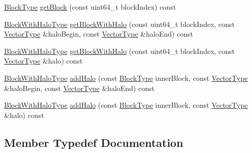 \begin{DoxyCompactItemize}
\item 
\hyperlink{classnifty_1_1tools_1_1Blocking_a597e0d4186d2d40ccb96698cc16775c6}{Block\+Type} \hyperlink{classnifty_1_1tools_1_1Blocking_ac73c329e83e247c73698ea88d52ad8a4}{get\+Block} (const uint64\+\_\+t block\+Index) const 
\item 
\hyperlink{classnifty_1_1tools_1_1Blocking_abebd9361d89cc399bc495861fa4e331d}{Block\+With\+Halo\+Type} \hyperlink{classnifty_1_1tools_1_1Blocking_a314e368a33595f0ffe72cfcdc12d102f}{get\+Block\+With\+Halo} (const uint64\+\_\+t block\+Index, const \hyperlink{classnifty_1_1tools_1_1Blocking_a5f8df3d4cdf09803217d729a04018fb3}{Vector\+Type} \&halo\+Begin, const \hyperlink{classnifty_1_1tools_1_1Blocking_a5f8df3d4cdf09803217d729a04018fb3}{Vector\+Type} \&halo\+End) const 
\item 
\hyperlink{classnifty_1_1tools_1_1Blocking_abebd9361d89cc399bc495861fa4e331d}{Block\+With\+Halo\+Type} \hyperlink{classnifty_1_1tools_1_1Blocking_aed0cce73bd05265b57bac992a3de37a0}{get\+Block\+With\+Halo} (const uint64\+\_\+t block\+Index, const \hyperlink{classnifty_1_1tools_1_1Blocking_a5f8df3d4cdf09803217d729a04018fb3}{Vector\+Type} \&halo) const 
\item 
\hyperlink{classnifty_1_1tools_1_1Blocking_abebd9361d89cc399bc495861fa4e331d}{Block\+With\+Halo\+Type} \hyperlink{classnifty_1_1tools_1_1Blocking_adfe3586bcaa6db42913304e929a120ac}{add\+Halo} (const \hyperlink{classnifty_1_1tools_1_1Blocking_a597e0d4186d2d40ccb96698cc16775c6}{Block\+Type} inner\+Block, const \hyperlink{classnifty_1_1tools_1_1Blocking_a5f8df3d4cdf09803217d729a04018fb3}{Vector\+Type} \&halo\+Begin, const \hyperlink{classnifty_1_1tools_1_1Blocking_a5f8df3d4cdf09803217d729a04018fb3}{Vector\+Type} \&halo\+End) const 
\item 
\hyperlink{classnifty_1_1tools_1_1Blocking_abebd9361d89cc399bc495861fa4e331d}{Block\+With\+Halo\+Type} \hyperlink{classnifty_1_1tools_1_1Blocking_a6baa908875fc3e55c698ffa96cc7b57c}{add\+Halo} (const \hyperlink{classnifty_1_1tools_1_1Blocking_a597e0d4186d2d40ccb96698cc16775c6}{Block\+Type} inner\+Block, const \hyperlink{classnifty_1_1tools_1_1Blocking_a5f8df3d4cdf09803217d729a04018fb3}{Vector\+Type} \&halo) const 
\end{DoxyCompactItemize}


\subsection{Member Typedef Documentation}
\hypertarget{classnifty_1_1tools_1_1Blocking_a597e0d4186d2d40ccb96698cc16775c6}{}
